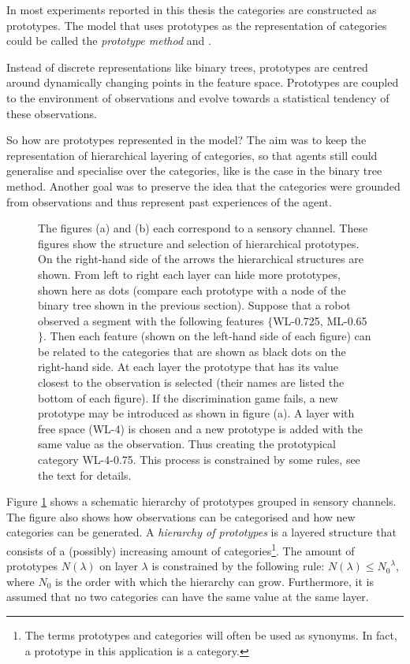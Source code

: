 In most experiments reported in this thesis the categories are constructed as prototypes. The model that uses prototypes as the representation of categories could be called the {\em prototype method} \cite{dejongvogt:1998} and \cite{vogt:1998c}.

Instead of discrete representations like binary trees, prototypes are centred around dynamically changing points in the feature space. Prototypes are coupled to the environment of observations and evolve towards a statistical tendency of these observations.

So how are prototypes represented in the model? The aim was to keep the representation of hierarchical layering of categories, so that agents still could generalise and specialise over the categories, like is the case in the binary tree method. Another goal was to preserve the idea that the categories were grounded from observations and thus represent past experiences of the agent. 

\begin{figure}[t]
\centering
{}
\caption{The figures (a) and (b) each correspond to a sensory channel. These figures show the structure and selection of hierarchical prototypes. On the right-hand side of the arrows the hierarchical structures are shown. From left to right each layer can hide more prototypes, shown here as dots (compare each prototype with a node of the binary tree shown in the previous section).
Suppose that a robot observed a segment with the following features $\{$WL-0.725, ML-0.65$\}$. Then each feature (shown on the left-hand side of each figure) can be related to the categories that are shown as black dots on the right-hand side. At each layer the prototype that has its value closest to the observation is selected (their names are listed the bottom of each figure). If the discrimination game fails, a new prototype may be introduced as shown in figure (a). A layer with free space (WL-4) is chosen and a new prototype is added with the same value as the observation. Thus creating the prototypical category WL-4-0.75. This process is constrained by some rules, see the text for details.}
\label{f:cm:prototree}
\end{figure}

Figure \ref{f:cm:prototree} shows a schematic hierarchy of prototypes grouped in sensory channels. The figure also shows how observations can be categorised and how new categories can be generated. A {\em hierarchy of prototypes} is a layered structure that consists of a (possibly) increasing amount of categories\footnote{The terms prototypes and categories will often be used as synonyms. In fact, a prototype in this application is a category.}. The amount of prototypes $N(\lambda)$ on layer $\lambda$ is constrained by the following rule: $N(\lambda)\leq {N_0}^\lambda$, where $N_0$ is the order with which the hierarchy can grow. Furthermore, it is assumed that no two categories can have the same value at the same layer.

